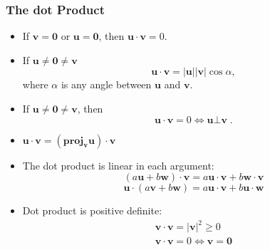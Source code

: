 \begin{frame}
\frametitle{The dot Product}
\begin{itemize}
\item<1-> If $\bm{v}=\bm{0}$ or $\bm{u}=\bm{0}$, then $\bm{u}\cdot \bm{v} =0$.
\item<2-> If $\bm{u} \neq \bm 0 \neq \bm{v}$
\[
\bm{u} \cdot \bm{v} = |\bm{u}|  |\bm{v}| \cos{\alpha},
\]
where $\alpha$ is any angle between $\bm u$ and $\bm v$.
\item<3-> If $\bm{u}\neq \bm{0} \neq \bm{v}$, then
$$\bm{u} \cdot \bm{v} = 0 \Longleftrightarrow \bm{u} \bot \bm{v}\; .$$
\item<4-> $\bm{u} \cdot \bm{v} = (\textbf{proj}_{\bm{v}} \bm{u}) \cdot \bm{v}$
\item<5-> The dot product is linear in each argument:
\[
(a \bm{u} + b \bm{w}) \cdot \bm{v} = a \bm{u} \cdot \bm{v} + b \bm{w} \cdot \bm{v}
\]
\[
\bm{u} \cdot (a \bm{v} + b \bm{w}) = a \bm{u} \cdot \bm{v} + b \bm{u} \cdot \bm{w}
\]
\item<6-> Dot product is positive definite:
\[
\begin{array}{l}
\bm{v} \cdot \bm{v} = |\bm{v}|^2 \geqslant 0 \\
\bm{v}\cdot \bm{v} = 0 \Leftrightarrow \bm{v}=\bm{0}
\end{array}
\]
\end{itemize}

\end{frame}